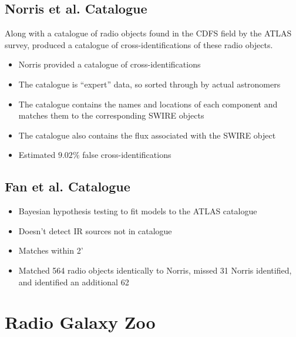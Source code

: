 
        \subsection{Norris et al. Catalogue}
        \label{sec:norris}

            Along with a catalogue of radio objects found in the CDFS field by the ATLAS survey,  produced a catalogue of cross-identifications of these radio objects. 

            \begin{itemize}
                \item Norris provided a catalogue of cross-identifications
                \item The catalogue is ``expert'' data, so sorted through by actual astronomers
                \item The catalogue contains the names and locations of each component and matches them to the corresponding SWIRE objects
                \item The catalogue also contains the flux associated with the SWIRE object
                \item Estimated $9.02\%$ false cross-identifications
            \end{itemize}

        \subsection{Fan et al. Catalogue}
        \label{sec:fan}

            \begin{itemize}
                \item Bayesian hypothesis testing to fit models to the ATLAS catalogue
                \item Doesn't detect IR sources not in catalogue
                \item Matches within 2'
                \item Matched 564 radio objects identically to Norris, missed 31 Norris identified, and identified an additional 62
            \end{itemize}

    \section{Radio Galaxy Zoo}
    \label{sec:radio-galaxy-zoo}

